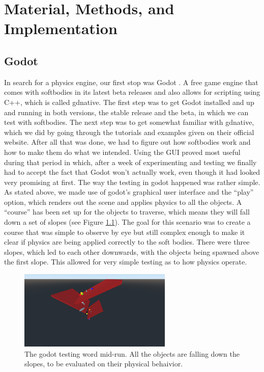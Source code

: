 \documentclass[12pt,oneside,listof=totoc,paper=a4,headings=small]{scrbook}
\begin{document}
\chapter{Material, Methods, and Implementation}


\section{Godot}
In search for a physics engine, our first stop was Godot \cite{linietsky2007godot}. A free game engine that comes with softbodies in its latest beta releases and  also allows for scripting using C++, which is called gdnative. The first step was to get Godot installed and up and running in both versions, the stable release and the beta, in which we can test with softbodies. The next step was to get somewhat familiar with gdnative, which we did by going through the tutorials and examples given on their official website. 
After all that was done, we had to figure out how softbodies work and how to make them do what we intended. Using the GUI proved most useful during that period in which, after a week of experimenting and testing we finally had to accept the fact that Godot won't actually work, even though it had looked very promising at first. 
The way the testing in godot happened was rather simple. As stated above, we made use of godot's graphical user interface and the ``play'' option, which renders out the scene and applies physics to all the objects. A ``course'' has been set up for the objects to traverse, which means they will fall down a set of slopes (see Figure \ref{fig:Godot}). The goal for this scenario was to create a course that was simple to observe by eye but still complex enough to make it clear if physics are being applied correctly to the soft bodies. There were three slopes, which led to each other downwards, with the objects being spawned above the first slope. This allowed for very simple testing as to how physics operate. %

\begin{figure}[h!]
\centering
\includegraphics[width=0.65\textwidth,height=0.65\textheight,keepaspectratio]{images/godot.png}
\caption{The godot testing word mid-run. All the objects are falling down the slopes, to be evaluated on their physical behaivior.}
\label{fig:Godot}
\end{figure}
\end{document}
